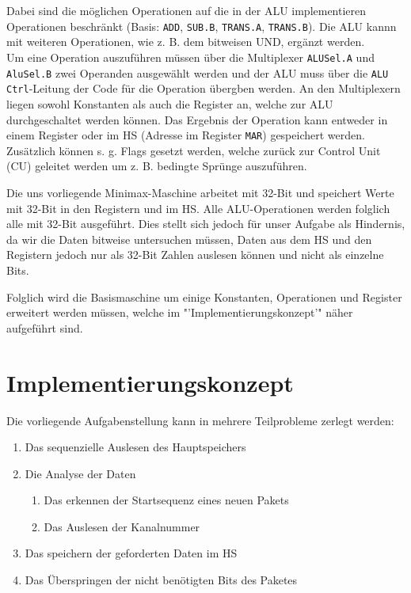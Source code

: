 \documentclass[12pt,titlepage]{article}
\begin{document}
\leavevmode \\
\\
Dabei sind die m{\"o}glichen Operationen auf die in der ALU implementieren
Operationen beschr{\"a}nkt (Basis: \texttt{ADD}, \texttt{SUB.B}, \texttt{TRANS.A}, \texttt{TRANS.B}). Die ALU kannn mit weiteren Operationen,
wie z. B. dem bitweisen UND, erg{\"a}nzt werden.\\
Um eine Operation auszuf{\"u}hren m{\"u}ssen {\"u}ber die Multiplexer \texttt{ALUSel.A} und \texttt{AluSel.B} zwei Operanden ausgew{\"a}hlt werden
und der ALU muss {\"u}ber die \texttt{ALU Ctrl}-Leitung der Code f{\"u}r die Operation {\"u}bergben werden. An den Multiplexern liegen sowohl
Konstanten als auch die Register an, welche zur ALU durchgeschaltet werden k{\"o}nnen. Das Ergebnis der Operation kann
entweder in einem Register oder im HS (Adresse im Register \texttt{MAR}) gespeichert werden. Zus{\"a}tzlich k{\"o}nnen s. g. Flags 
gesetzt werden, welche zur{\"u}ck zur Control Unit (CU) geleitet werden um z. B. bedingte Spr{\"u}nge auszuf{\"u}hren.


Die uns vorliegende Minimax-Maschine arbeitet mit 32-Bit und speichert Werte mit 32-Bit in den Registern und im HS.
Alle ALU-Operationen werden folglich alle mit 32-Bit ausgef{\"u}hrt. Dies stellt sich jedoch f{\"u}r unser Aufgabe als
Hindernis, da wir die Daten bitweise untersuchen m{\"u}ssen, Daten aus dem HS und den Registern jedoch nur als
32-Bit Zahlen auslesen k{\"o}nnen und nicht als einzelne Bits.

Folglich wird die Basismaschine um einige Konstanten, Operationen und Register erweitert werden müssen, welche im "'Implementierungskonzept'" n{\"a}her
aufgeführt sind.

\newpage

\section{Implementierungskonzept}
Die vorliegende Aufgabenstellung kann in mehrere Teilprobleme zerlegt werden:
\begin{enumerate}
\item Das sequenzielle Auslesen des Hauptspeichers
\item Die Analyse der Daten
    \begin{enumerate}
    \item Das erkennen der Startsequenz eines neuen Pakets
    \item Das Auslesen der Kanalnummer
    \end{enumerate}
\item Das speichern der geforderten Daten im HS
\item Das Überspringen der nicht benötigten Bits des Paketes
\end{enumerate}
\end{document}
